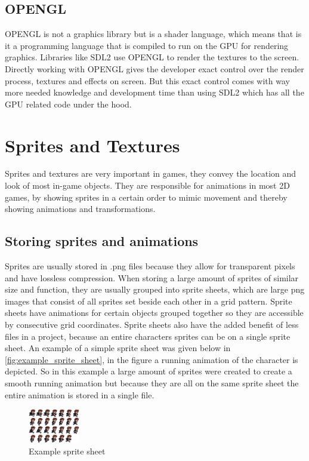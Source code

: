 \documentclass{article} %
\begin{document}
\subsection{OPENGL}
OPENGL \cite{opengl} is not a graphics library but is a shader language, which means that is it a programming language that is compiled to run on the GPU for rendering graphics.
Libraries like SDL2 \cite{sdl2} use OPENGL to render the textures to the screen.
Directly working with OPENGL gives the developer exact control over the render process, textures and effects on screen.
But this exact control comes with way more needed knowledge and development time than using SDL2 which has all the GPU related code under the hood.

\newpage


\section{Sprites and Textures}
Sprites and textures are very important in games, they convey the location and look of most in-game objects.
They are responsible for animations in most 2D games, by showing sprites in a certain order to mimic movement and thereby showing animations and transformations.

\subsection{Storing sprites and animations}
Sprites are usually stored in .png files because they allow for transparent pixels and have lossless compression.
When storing a large amount of sprites of similar size and function, they are usually grouped into sprite sheets, which are large png images that consist of all sprites set beside each other in a grid pattern.
Sprite sheets have animations for certain objects grouped together so they are accessible by consecutive grid coordinates.
Sprite sheets also have the added benefit of less files in a project, because an entire characters sprites can be on a single sprite sheet.
An example of a simple sprite sheet was given below in \autoref{fig:example_sprite_sheet}, in the figure a running animation of the character is depicted.
So in this example a large amount of sprites were created to create a smooth running animation but because they are all on the same sprite sheet the entire animation is stored in a single file.
\begin{figure}[h!]
	\centering
	\includegraphics[width=0.2\textwidth]{example_sprite_sheet.png}
	\caption{Example sprite sheet}
	\label{fig:example_sprite_sheet}
\end{figure}
\end{document}

